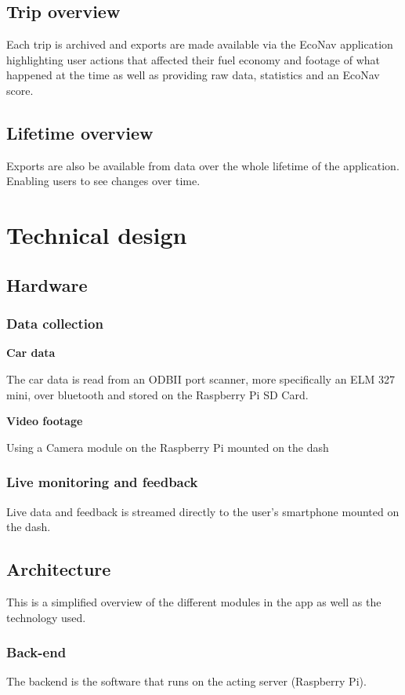 \documentclass[a4paper,12pt]{article}
\begin{document}
\subsection{Trip overview}
Each trip is archived and exports are made available via the EcoNav application highlighting user actions that affected their fuel economy and footage of what happened at the time as well as providing raw data, statistics and an EcoNav score.

\subsection{Lifetime overview}
Exports are also be available from data over the whole lifetime of the application. Enabling users to see changes over time.

\pagebreak

\section{Technical design}
\subsection{Hardware}

\subsubsection{Data collection}
\textbf{Car data}
	
	The car data is read from an ODBII port scanner, more specifically an ELM 327 mini, over bluetooth and stored on the Raspberry Pi SD Card.
	
	
\textbf{Video footage}
	
Using a Camera module on the Raspberry Pi mounted on the dash

\subsubsection{Live monitoring and feedback}
Live data and feedback is streamed directly to the user's smartphone mounted on the dash.

\pagebreak

\subsection{Architecture}
This is a simplified overview of the different modules in the app as well as the technology used.
\subsubsection{Back-end}
The backend is the software that runs on the acting server (Raspberry Pi). 
\end{document}
